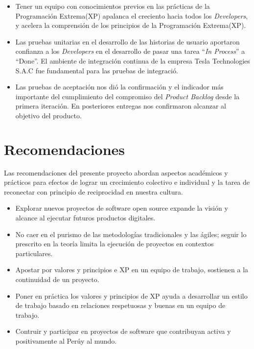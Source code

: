 \begin{spacing}{1.5}
\begin{itemize}
	\item Tener un equipo con conocimientos previos en las pr\'{a}cticas de la Programaci\'{o}n Extrema(XP) apalanca el creciento hacia todos los \textit{Developers}, y acelera la comprensi\'{o}n de los principios de la Programaci\'{o}n Extrema(XP).
	
	\item Las pruebas unitarias en el desarrollo de las historias de usuario aportaron confianza a los \textit{Developers} en el desarrollo de pasar una tarea ``\textit{In Process}'' a ``Done''. El ambiente de integraci\'{o}n continua de la empresa Tesla Technologies S.A.C fue fundamental para las pruebas de integraci\'{o}.
	
	\item Las pruebas de aceptaci\'{o}n nos di\'{o} la confirmaci\'{o}n y el indicador m\'{a}s importante del cumplimiento del compromiso del \textit{Product Backlog} desde la primera iteraci\'{o}n. En posteriores entregas nos confirmaron alcanzar al objetivo del producto.
	
\end{itemize}
\clearpage
\section{Recomendaciones}
	Las recomendaciones del presente proyecto abordan aspectos acad\'{e}micos y pr\'{a}cticos para efectos de lograr un crecimiento colectivo e individual y la tarea de reconectar con principio de reciprocidad en nuestra cultura.
	
	\begin{itemize}
		\item Explorar nuevos proyectos de software open source expande la visión y alcance al ejecutar futuros productos digitales.
		\item No caer en el purismo de las metodolog\'{i}as tradicionales y las \'{a}giles; seguir lo prescrito en la teor\'{i}a limita la ejecuci\'{o}n de proyectos en contextos particulares.
		\item Apostar por valores y principios e XP en un equipo de trabajo, sostienen a la continuidad de un proyecto.
		\item Poner en pr\'{a}ctica los valores y principios de XP ayuda a desarrollar un estilo de trabajo basado en relaciones respetuosas y buenas en un equipo de trabajo. 
		\item Contruir y participar en proyectos de software que contribuyan activa y positivamente al Per\'{u}y al mundo.
	\end{itemize}
\end{spacing}